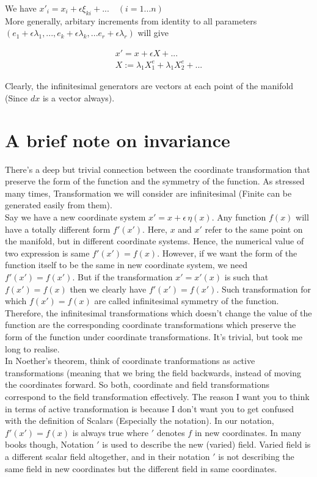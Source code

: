 \documentclass{report}
\begin{document}
\noindent We have $x'_i = x_i + \epsilon \xi_{ki} + ... \quad (i=1...n)$\\

\noindent More generally, arbitary increments from identity to all parameters $(e_1 + \epsilon\lambda_1,...,e_k+\epsilon\lambda_k,...e_r+\epsilon\lambda_r)$ will give

\begin{gather}
x' = x + \epsilon X +...\\
X := \lambda_1 X_1^e + \lambda_1 X_2^e+...
\end{gather}

Clearly, the infinitesimal generators are vectors at each point of the manifold (Since $dx$ is a vector always). 

\section{A brief note on invariance}

There's a deep but trivial connection between the coordinate transformation that preserve the form of the function and the symmetry of the function. As stressed many times, Transformation we will consider are infinitesimal (Finite can be generated easily from them).\\

\noindent Say we have a new coordinate system $x' = x + \epsilon \, \eta(x)$. Any function $f(x)$ will have a totally different form $f'(x')$. Here, $x$ and $x'$ refer to the same point on the manifold, but in different coordinate systems. Hence, the numerical value of two expression is same $f'(x') = f(x)$. However, if we want the form of the function itself to be the same in new coordinate system, we need $f'(x') = f(x')$. But if the transformation $x'=x'(x)$ is such that $f(x') = f(x)$ then we clearly have $f'(x') = f(x')$. Such transformation for which $f(x') = f(x)$ are called infinitesimal symmetry of the function. Therefore, the infinitesimal transformations which doesn't change the value of the function are the corresponding coordinate transformations which preserve the form of the function under coordinate transformations. It's trivial, but took me long to realise.\\

\noindent In Noether's theorem, think of coordinate tranformations as active transformations (meaning that we bring the field backwards, instead of moving the coordinates forward. So both, coordinate and field transformations correspond to the field transformation effectively. The reason I want you to think in terms of active transformation is because I don't want you to get confused with the definition of Scalars (Especially the notation). In our notation, $f'(x') = f(x)$ is always true where $'$ denotes $f$ in new coordinates. In many books though, Notation $'$ is  used to describe the new (varied) field. Varied field is a different scalar field altogether, and in their notation $'$ is not describing the same field in new coordinates but the different field in same coordinates.
\end{document}
